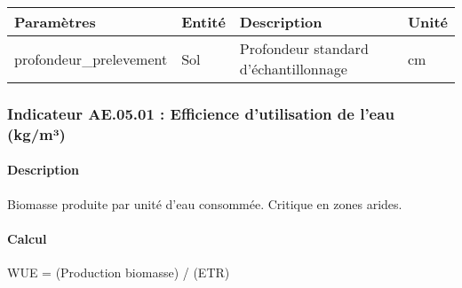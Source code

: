 \documentclass[
]{article}
\newenvironment{Shaded}{\begin{snugshade}}{\end{snugshade}}
\newcommand{\NormalTok}[1]{#1}
\begin{document}
\begin{longtable}[]{@{}
  >{\raggedright\arraybackslash}p{}
  >{\raggedright\arraybackslash}p{}
  >{\raggedright\arraybackslash}p{}
  >{\raggedright\arraybackslash}p{}@{}}
\toprule\noalign{}
\begin{minipage}[b]{\linewidth}\raggedright
\textbf{Paramètres}
\end{minipage} & \begin{minipage}[b]{\linewidth}\raggedright
\textbf{Entité}
\end{minipage} & \begin{minipage}[b]{\linewidth}\raggedright
\textbf{Description}
\end{minipage} & \begin{minipage}[b]{\linewidth}\raggedright
\textbf{Unité}
\end{minipage} \\
\midrule\noalign{}
\endhead
\bottomrule\noalign{}
\endlastfoot
profondeur\_prelevement & Sol & Profondeur standard d'échantillonnage &
cm \\
\end{longtable}

\subsubsection{Indicateur AE.05.01 : Efficience d'utilisation de l'eau
(kg/m³)}\label{indicateur-ae.05.01-efficience-dutilisation-de-leau-kgmuxb3}

\paragraph{Description}\label{description-12}

Biomasse produite par unité d'eau consommée. Critique en zones arides.

\paragraph{Calcul}\label{calcul-12}

\begin{Shaded}
\begin{Highlighting}[]
\NormalTok{WUE = (Production biomasse) / (ETR)}
\end{Highlighting}
\end{Shaded}
\end{document}
